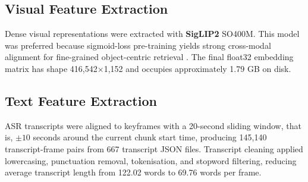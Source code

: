 \begin{table}[t]
\centering
\small
{}
\caption{CASTLE 2024 dataset and preprocessing statistics.}
\label{tab:dataset-stats}
\end{table}

\subsection{Visual Feature Extraction}
\label{sec:visual-features}

Dense visual representations were extracted with \textbf{SigLIP2} SO400M. This model was preferred because sigmoid-loss pre-training yields strong cross-modal alignment for fine-grained object-centric retrieval \cite{zhai2023sigmoid}. The final float32 embedding matrix has shape 416,542$\times$1,152 and occupies approximately 1.79 GB on disk.

\subsection{Text Feature Extraction}
\label{sec:text-features}

ASR transcripts were aligned to keyframes with a 20-second sliding window, that is, \(\pm 10\) seconds around the current chunk start time, producing 145,140 transcript-frame pairs from 667 transcript JSON files. Transcript cleaning applied lowercasing, punctuation removal, tokenisation, and stopword filtering, reducing average transcript length from 122.02 words to 69.76 words per frame.

